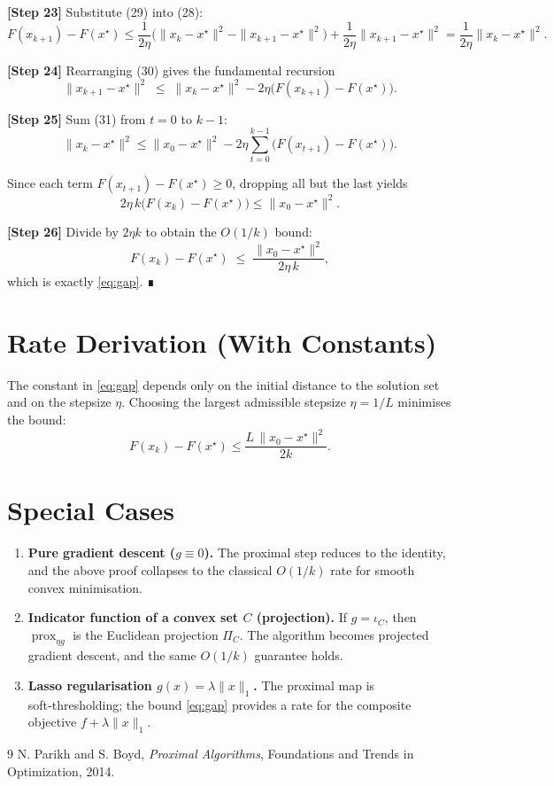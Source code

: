 \documentclass{article}
\newcommand{\prox}{\operatorname{prox}}
\begin{document}
\noindent\textbf{[Step 23]} Substitute (29) into (28):
\[
F(x_{k+1})-F(x^\star)
\le \frac{1}{2\eta}\bigl(\|x_k-x^\star\|^2-\|x_{k+1}-x^\star\|^2\bigr)
+\frac{1}{2\eta}\|x_{k+1}-x^\star\|^2
= \frac{1}{2\eta}\|x_k-x^\star\|^2 .
\tag{30}
\]

\noindent\textbf{[Step 24]} Rearranging (30) gives the fundamental recursion
\[
\|x_{k+1}-x^\star\|^2 \;\le\; \|x_k-x^\star\|^2 -2\eta\bigl(F(x_{k+1})-F(x^\star)\bigr).
\tag{31}
\]

\noindent\textbf{[Step 25]} Sum (31) from $t=0$ to $k-1$:
\[
\|x_k-x^\star\|^2 \le \|x_0-x^\star\|^2 -2\eta\sum_{t=0}^{k-1}\bigl(F(x_{t+1})-F(x^\star)\bigr).
\tag{32}
\]

Since each term $F(x_{t+1})-F(x^\star)\ge 0$, dropping all but the last yields
\[
2\eta\,k\bigl(F(x_k)-F(x^\star)\bigr)\le \|x_0-x^\star\|^2 .
\tag{33}
\]

\noindent\textbf{[Step 26]} Divide by $2\eta k$ to obtain the $O(1/k)$ bound:
\[
F(x_k)-F(x^\star)\;\le\;\frac{\|x_0-x^\star\|^2}{2\eta\,k},
\]
which is exactly \eqref{eq:gap}. ∎

\section*{Rate Derivation (With Constants)}
The constant in \eqref{eq:gap} depends only on the initial distance to the solution set and on the stepsize $\eta$. Choosing the largest admissible stepsize $\eta=1/L$ minimises the bound:
\[
F(x_k)-F(x^\star)\le \frac{L\,\|x_0-x^\star\|^2}{2k}.
\]

\section*{Special Cases}
\begin{enumerate}[label=\arabic*.]
\item \textbf{Pure gradient descent ($g\equiv0$).} The proximal step reduces to the identity, and the above proof collapses to the classical $O(1/k)$ rate for smooth convex minimisation.
\item \textbf{Indicator function of a convex set $C$ (projection).} If $g=\iota_C$, then $\prox_{\eta g}$ is the Euclidean projection $\Pi_C$. The algorithm becomes projected gradient descent, and the same $O(1/k)$ guarantee holds.
\item \textbf{Lasso regularisation $g(x)=\lambda\|x\|_1$.} The proximal map is soft‑thresholding; the bound \eqref{eq:gap} provides a rate for the composite objective $f+\lambda\|x\|_1$.
\end{enumerate}

\begin{thebibliography}{9}
N. Parikh and S. Boyd, \emph{Proximal Algorithms}, Foundations and Trends in Optimization, 2014.
\end{thebibliography}
\end{document}
